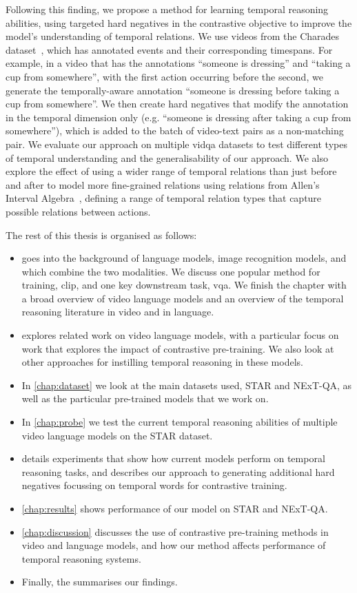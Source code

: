 Following this finding, we propose a method for learning temporal reasoning
abilities, using targeted hard negatives in the contrastive objective to
improve the model's understanding of temporal relations. We use videos from the
Charades dataset~\cite{sigurdsson2016charades}, which has annotated events and
their corresponding timespans. For example, in a video that has
the annotations ``someone is dressing'' and ``taking a cup from somewhere'',
with the first action occurring before the second, we generate the
temporally-aware annotation ``someone is dressing before taking a cup from
somewhere''. We then create hard negatives that modify the annotation in the
temporal dimension only (e.g.  ``someone is dressing after taking a cup from
somewhere''), which is added to the batch of video-text pairs as a non-matching
pair. We evaluate our approach on multiple \acrshort{vidqa} datasets to test
different types of temporal understanding and the generalisability of our
approach. We also explore the effect of using a wider range of temporal
relations than just before and after to model more fine-grained relations using
relations from Allen's Interval Algebra~\citep{allen1983interval}, defining a
range of temporal relation types that capture possible relations between
actions.

The rest of this thesis is organised as follows:

\begin{itemize}
	\item {} goes into the background of language models, image
		recognition models, and  which combine the two
		modalities. We discuss one popular method for training, \Acrfull{clip},
		and one key downstream task, \acrlong{vqa}. We finish the chapter with
		a broad overview of video language models and an overview of the
		temporal reasoning literature in video and in language.
	\item {} explores related work on video language models,
		with a particular focus on work that explores the impact of contrastive
		pre-training. We also look at other approaches for instilling temporal
		reasoning in these models.
	\item In \cref{chap:dataset} we look at the main datasets used, STAR and
		NExT-QA, as well as the particular pre-trained models that we work on.
	\item In \cref{chap:probe} we test the current temporal reasoning abilities
		of multiple video language models on the STAR dataset.
	\item {} details experiments that show how current
		models perform on temporal reasoning tasks, and describes our approach
		to generating additional hard negatives focussing on temporal words for
		contrastive training.
	\item \cref{chap:results} shows performance of our model on STAR and NExT-QA.
	\item \cref{chap:discussion} discusses the use of contrastive
		pre-training methods in video and language models, and how our method
		affects performance of temporal reasoning systems.
	\item Finally, the  summarises our findings.
\end{itemize}
